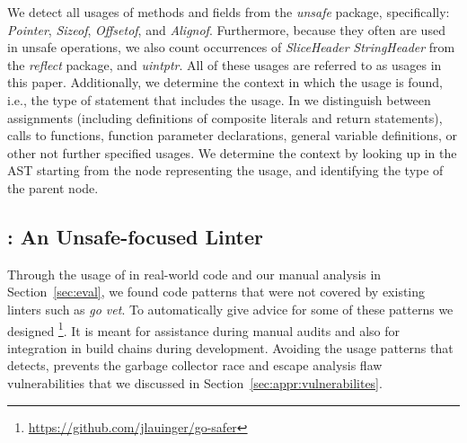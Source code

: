 
We detect all usages of methods and fields from the \textit{unsafe} package, specifically: \textit{Pointer}, \textit{Sizeof}, \textit{Offsetof}, and \textit{Alignof}.
Furthermore, because they often are used in unsafe operations, we also count occurrences of \textit{SliceHeader} \textit{StringHeader} from the \textit{reflect} package, and \textit{uintptr}.
All of these usages are referred to as \unsafe{} usages in this paper.
Additionally, we determine the context in which the \unsafe{} usage is found, i.e., 
the type of statement that includes the \unsafe{} usage.
In \toolUsage{} we distinguish between assignments (including definitions of composite literals and return statements), calls to functions, function parameter declarations, general variable definitions, or other not further specified usages.
We determine the context by looking up in the AST starting from the node representing the \unsafe{} usage, and identifying the type of the parent node.




\subsection{\toolSA{}: An Unsafe-focused Linter}
\label{sec:appr:toolSA}

Through the usage of \toolUsage{} in real-world code and our manual analysis in Section~\ref{sec:eval}, we found \unsafe{} code patterns that were not covered by existing linters such as \textit{go vet}. 
To automatically give advice for some of these patterns we designed \toolSA{}\footnote{\url{https://github.com/jlauinger/go-safer}}.
It is meant for assistance during manual audits and also for integration in build chains during development.
Avoiding the \unsafe{} usage patterns that \toolSA{} detects, prevents the garbage collector race and escape analysis flaw vulnerabilities that we discussed in Section~\ref{sec:appr:vulnerabilites}.

